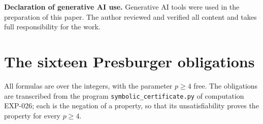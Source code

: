 \documentclass[11pt]{article}
\theoremstyle{definition}
\theoremstyle{remark}
\begin{document}
\medskip
\noindent\textbf{Declaration of generative AI use.} Generative AI tools were used in the
preparation of this paper. The author reviewed and verified all content and takes full
responsibility for the work.

\appendix

\section{The sixteen Presburger obligations}\label{app:obligations}

All formulas are over the integers, with the parameter $p\geq4$ free. The obligations are
transcribed from the program \texttt{symbolic\_certificate.py} of computation EXP-026; each is the
negation of a property, so that its unsatisfiability proves the property for every $p\geq4$.
\end{document}
